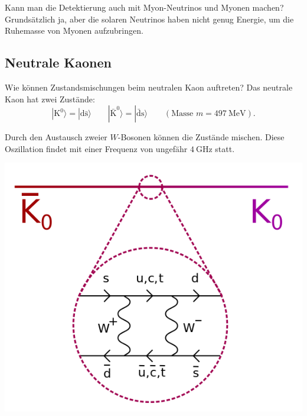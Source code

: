 \begin{fquestion}{Kann man die Detektierung auch mit Myon-Neutrinos und Myonen machen? }
    Grundsätzlich ja, aber die solaren Neutrinos haben nicht genug Energie, um die Ruhemasse von Myonen aufzubringen.
\end{fquestion}




\subsection{Neutrale Kaonen}

\begin{fquestion}{Wie können Zustandsmischungen beim neutralen Kaon auftreten?}
    Das neutrale Kaon hat zwei Zustände:
    \[|\mathrm{K}^0 \rangle = |\mathrm{d} \bar{\mathrm{s}}  \rangle \qquad |\bar{\mathrm{K}}^0 \rangle = |\bar{\mathrm{d}} \mathrm{s} \rangle \qquad (\text{Masse } m = \SI{497}{\mega\electronvolt}).\]
    
    Durch den Austausch zweier $W$-Bosonen können die Zustände mischen.
    Diese Oszillation findet mit einer Frequenz von ungefähr $\SI{4}{\giga\hertz}$ statt.
    \begin{center}
        \includegraphics[width=0.4\linewidth]{img/Kaon-box-diagram-with-bar.svg.png}
    \end{center}
\end{fquestion}

